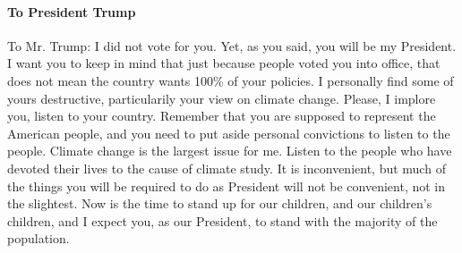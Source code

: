 \documentclass[twoside]{article}
\begin{document}
              \paragraph{To President Trump} To Mr. Trump: I did not vote for you. Yet, as you said, you will be my President. I want you to keep in mind that just because people voted
              you into office, that does not mean the country wants 100\% of your policies. I personally find some of yours destructive, particularily your view on climate change. Please,
              I implore you, listen to your country. Remember that you are supposed to represent the American people, and you need to put aside personal convictions to listen to the people.
              Climate change is the largest issue for me. Listen to the people who have devoted their lives to the cause of climate study. It is inconvenient, but much of the things you will
              be required to do as President will not be convenient, not in the slightest. Now is the time to stand up for our children, and our children's children, and I expect you, as our
              President, to stand with the majority of the population.
              \newpage
\end{document}
